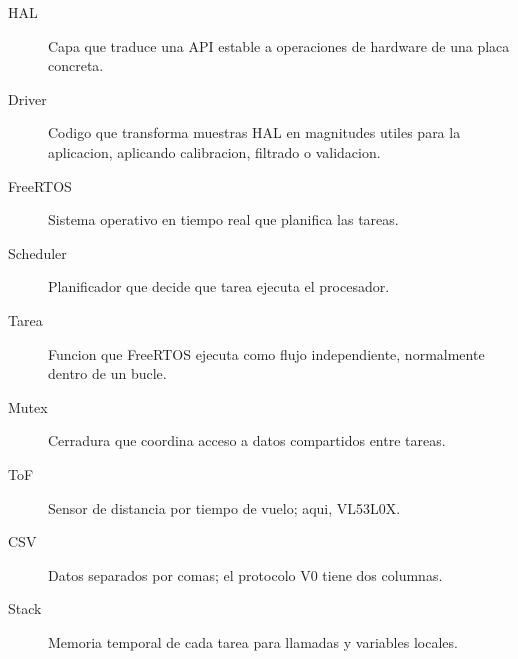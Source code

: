 \documentclass[11pt,a4paper]{article}
\begin{document}
\begin{description}
  \item[HAL] Capa que traduce una API estable a operaciones de hardware de una
        placa concreta.
  \item[Driver] Codigo que transforma muestras HAL en magnitudes utiles para
        la aplicacion, aplicando calibracion, filtrado o validacion.
  \item[FreeRTOS] Sistema operativo en tiempo real que planifica las tareas.
  \item[Scheduler] Planificador que decide que tarea ejecuta el procesador.
  \item[Tarea] Funcion que FreeRTOS ejecuta como flujo independiente, normalmente
        dentro de un bucle.
  \item[Mutex] Cerradura que coordina acceso a datos compartidos entre tareas.
  \item[ToF] Sensor de distancia por tiempo de vuelo; aqui, VL53L0X.
  \item[CSV] Datos separados por comas; el protocolo V0 tiene dos columnas.
  \item[Stack] Memoria temporal de cada tarea para llamadas y variables locales.
\end{description}
\end{document}
